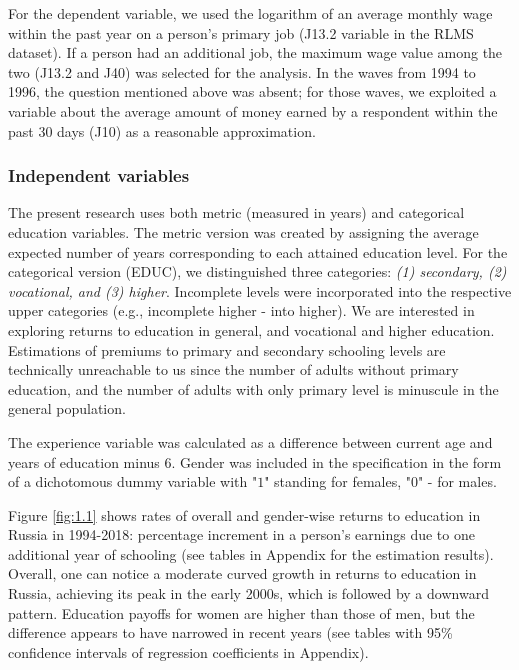 \documentclass[12pt,a4paper]{article}
\numberwithin{equation}{section}
\begin{document}
For the dependent variable, we used the logarithm of an average monthly wage within the past year on a person's primary job (J13.2 variable in the RLMS dataset). If a person had an additional job, the maximum wage value among the two (J13.2 and J40) was selected for the analysis. In the waves from 1994 to 1996, the question mentioned above was absent; for those waves, we exploited a variable about the average amount of money earned by a respondent within the past 30 days (J10) as a reasonable approximation.
\\

\subsubsection{Independent variables}

The present research uses both metric (measured in years) and categorical education variables. The metric version was created by assigning the average expected number of years corresponding to each attained education level. For the categorical version (EDUC), we distinguished three categories: \textit{(1) secondary, (2) vocational, and (3) higher}. Incomplete levels were incorporated into the respective upper categories (e.g., incomplete higher - into higher). We are interested in exploring returns to education in general, and vocational and higher education. Estimations of premiums to primary and secondary schooling levels are technically unreachable to us since the number of adults without primary education, and the number of adults with only primary level is minuscule in the general population. 

The experience variable was calculated as a difference between current age and years of education minus $6$. Gender was included in the specification in the form of a dichotomous dummy variable with "$1$" standing for females, "$0$" - for males.


Figure \ref{fig:1.1} shows rates of overall and gender-wise returns to education in Russia in 1994-2018: percentage increment in a person's earnings due to one additional year of schooling (see tables in Appendix for the estimation results). Overall, one can notice a moderate curved growth in returns to education in Russia, achieving its peak in the early 2000s, which is followed by a downward pattern. Education payoffs for women are higher than those of men, but the difference appears to have narrowed in recent years (see tables with 95\% confidence intervals of regression coefficients in Appendix).
\end{document}
